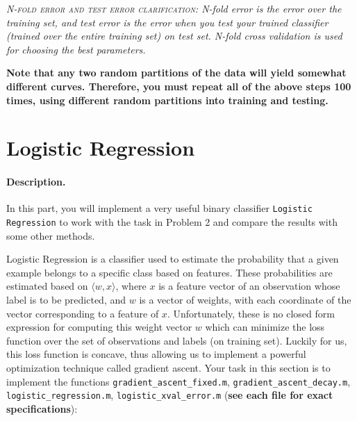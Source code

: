 \documentclass[english]{article}
\begin{document}
\emph{\textsc{N-fold error and test error clarification:} N-fold error is the error over the training set, and test error is the error when you test your trained classifier (trained over the entire training set) on test set. N-fold cross validation is used for choosing the best parameters. }

 {\bf Note that any two random partitions of the data will yield somewhat different curves. Therefore, you must repeat all of the above steps 100 times, using different random partitions into training and testing.}

\section{Logistic Regression }

\paragraph{Description.} In this part, you will implement a very useful binary classifier {\tt Logistic Regression} to work with the task in Problem 2 and compare the results with some other methods. 


 Logistic Regression is a classifier used to estimate the probability that a given example belongs to a specific class based on features. These probabilities are estimated based on $\langle w,x\rangle$, where $x$ is a feature vector of an observation whose label is to be predicted, and $w$ is a vector of weights, with each coordinate of the vector corresponding to a feature of $x$. Unfortunately, these is no closed form expression for computing this weight vector $w$ which can minimize the loss function over the set of observations and labels (on training set). Luckily for us, this loss function is concave, thus allowing us to implement a powerful optimization technique called gradient ascent. Your task in this section is to implement the functions {\tt gradient\_ascent\_fixed.m}, {\tt gradient\_ascent\_decay.m}, {\tt logistic\_regression.m}, {\tt logistic\_xval\_error.m}
({\bf see each file for exact specifications}):
\end{document}
